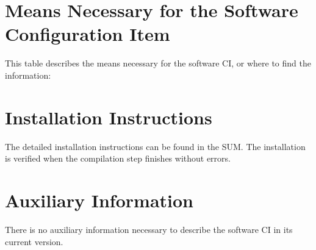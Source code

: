 
\chapter{Means Necessary for the Software Configuration Item}

This table describes the means necessary for the software CI, or where to find the information:

\chapter{Installation Instructions}

The detailed installation instructions can be found in the SUM. The installation is verified when the compilation step finishes without errors.

\chapter{Auxiliary Information}

There is no auxiliary information necessary to describe the software CI in its current version.